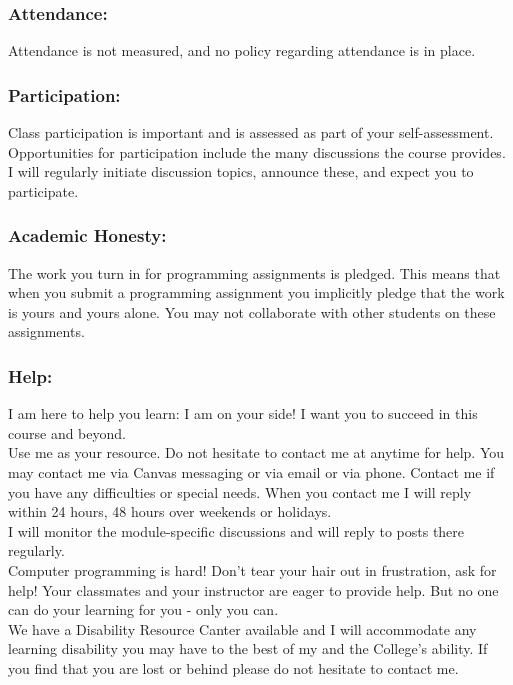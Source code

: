 \documentclass{article}
\begin{document}
\subsubsection{Attendance:}

Attendance is not measured, and no policy regarding attendance is in place.

\subsubsection{Participation:}

Class participation is important and is assessed as part of your self-assessment.  Opportunities for participation include the many discussions the course provides.  I will regularly initiate discussion topics, announce these, and expect you to participate.

\subsubsection{Academic Honesty:}

The work you turn in for programming assignments is pledged. This means that when you submit a programming assignment you implicitly pledge that the work is yours and yours alone. You may not collaborate with other students on these assignments.

\subsubsection{Help:}

I am here to help you learn:  I am on your side!  I want you to succeed in this course and beyond. 
\\
Use me as your resource.  Do not hesitate to contact me at anytime for help. You may contact me via Canvas messaging or via email or via phone. Contact me if you have any difficulties or special needs.  When you contact me I will reply within 24 hours, 48 hours over weekends or holidays.
\\
I will monitor the module-specific discussions and will reply to posts there regularly.
\\
Computer programming is hard!  Don't tear your hair out in frustration, ask for help!  Your classmates and your instructor are eager to provide help.  But no one can do your learning for you - only you can.
\\
We have a Disability Resource Canter available and I will accommodate any learning disability you may have to the best of my and the College’s ability.  If you find that you are lost or behind please do not hesitate to contact me.
\end{document}
